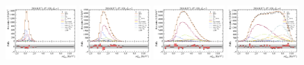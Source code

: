\begin{figure}[htb]
    \includegraphics[width=0.24\textwidth]{./figs-fit-fit-results/ctrl-fit/lines_q2_slices/fit_result-lines_q2_idx1-D0-1os-mmiss2.pdf}
    \includegraphics[width=0.24\textwidth]{./figs-fit-fit-results/ctrl-fit/lines_q2_slices/fit_result-lines_q2_idx2-D0-1os-mmiss2.pdf}
    \includegraphics[width=0.24\textwidth]{./figs-fit-fit-results/ctrl-fit/lines_q2_slices/fit_result-lines_q2_idx3-D0-1os-mmiss2.pdf}
    \includegraphics[width=0.24\textwidth]{./figs-fit-fit-results/ctrl-fit/lines_q2_slices/fit_result-lines_q2_idx4-D0-1os-mmiss2.pdf}


\end{figure}
